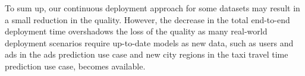 To sum up, our continuous deployment approach for some datasets may result in a small reduction in the quality.
However, the decrease in the total end-to-end deployment time overshadows the loss of the quality as many real-world deployment scenarios require up-to-date models as new data, such as users and ads in the ads prediction use case and new city regions in the taxi travel time prediction use case, becomes available.



